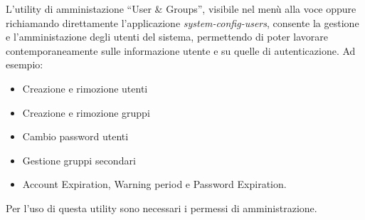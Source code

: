 L'utility di amministazione ``User \& Groups'', visibile nel menù alla voce  oppure richiamando direttamente l'applicazione \textit{system-config-users}, consente la gestione e l'amministazione degli utenti del sistema, permettendo di poter lavorare contemporaneamente sulle informazione utente e su quelle di autenticazione. Ad esempio:

\begin{itemize}
 \item Creazione e rimozione utenti
 \item Creazione e rimozione gruppi
 \item Cambio password utenti
 \item Gestione gruppi secondari
 \item Account Expiration, Warning period e Password Expiration.
\end{itemize}


Per l'uso di questa utility sono necessari i permessi di amministrazione.